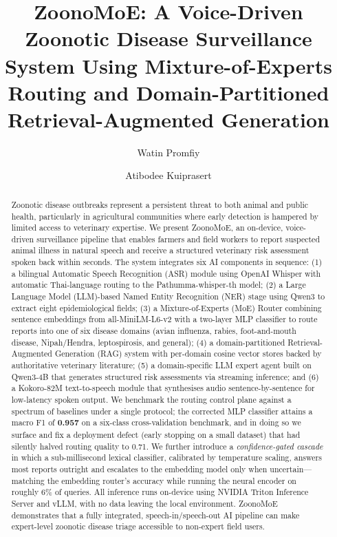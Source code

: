 \documentclass[runningheads]{llncs}
\begin{document}
%
\title{ZoonoMoE: A Voice-Driven Zoonotic Disease Surveillance System Using Mixture-of-Experts Routing and Domain-Partitioned Retrieval-Augmented Generation}
%
%
\author{Watin Promfiy \and Atibodee Kuiprasert}
%
%
%
\maketitle
%
\begin{abstract}
Zoonotic disease outbreaks represent a persistent threat to both animal and public health, particularly in agricultural communities where early detection is hampered by limited access to veterinary expertise. We present ZoonoMoE, an on-device, voice-driven surveillance pipeline that enables farmers and field workers to report suspected animal illness in natural speech and receive a structured veterinary risk assessment spoken back within seconds. The system integrates six AI components in sequence: (1) a bilingual Automatic Speech Recognition (ASR) module using OpenAI Whisper with automatic Thai-language routing to the Pathumma-whisper-th model; (2) a Large Language Model (LLM)-based Named Entity Recognition (NER) stage using Qwen3 to extract eight epidemiological fields; (3) a Mixture-of-Experts (MoE) Router combining sentence embeddings from all-MiniLM-L6-v2 with a two-layer MLP classifier to route reports into one of six disease domains (avian influenza, rabies, foot-and-mouth disease, Nipah/Hendra, leptospirosis, and general); (4) a domain-partitioned Retrieval-Augmented Generation (RAG) system with per-domain cosine vector stores backed by authoritative veterinary literature; (5) a domain-specific LLM expert agent built on Qwen3-4B that generates structured risk assessments via streaming inference; and (6) a Kokoro-82M text-to-speech module that synthesises audio sentence-by-sentence for low-latency spoken output. We benchmark the routing control plane against a spectrum of baselines under a single protocol; the corrected MLP classifier attains a macro F1 of \textbf{0.957} on a six-class cross-validation benchmark, and in doing so we surface and fix a deployment defect (early stopping on a small dataset) that had silently halved routing quality to 0.71. We further introduce a \emph{confidence-gated cascade} in which a sub-millisecond lexical classifier, calibrated by temperature scaling, answers most reports outright and escalates to the embedding model only when uncertain---matching the embedding router's accuracy while running the neural encoder on roughly 6\% of queries. All inference runs on-device using NVIDIA Triton Inference Server and vLLM, with no data leaving the local environment. ZoonoMoE demonstrates that a fully integrated, speech-in/speech-out AI pipeline can make expert-level zoonotic disease triage accessible to non-expert field users.


\end{abstract}
\end{document}
